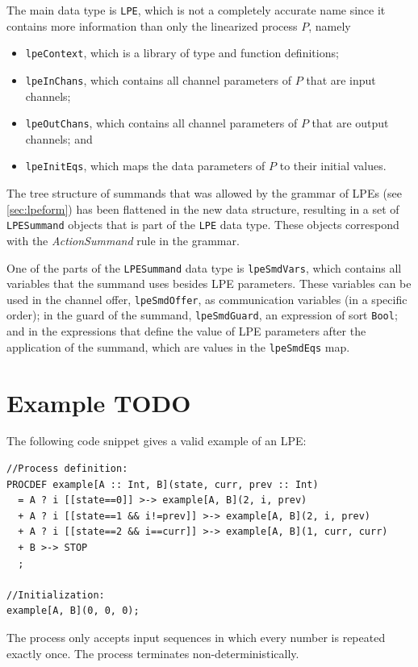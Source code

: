 The main data type is \texttt{LPE}, which is not a completely accurate name since it contains more information than only the linearized \txs{} process $P$, namely

\begin{itemize}
\item \texttt{lpeContext}, which is a library of \txs{} type and function definitions;
\item \texttt{lpeInChans}, which contains all channel parameters of $P$ that are input channels;
\item \texttt{lpeOutChans}, which contains all channel parameters of $P$ that are output channels; and
\item \texttt{lpeInitEqs}, which maps the data parameters of $P$ to their initial values.
\end{itemize}

The tree structure of summands that was allowed by the grammar of LPEs (see \ref{sec:lpeform}) has been flattened in the new data structure, resulting in a set of \texttt{LPESummand} objects that is part of the \texttt{LPE} data type.
These objects correspond with the \textit{ActionSummand} rule in the grammar.

One of the parts of the \texttt{LPESummand} data type is \texttt{lpeSmdVars}, which contains all variables that the summand uses besides LPE parameters.
These variables can be used in the channel offer, \texttt{lpeSmdOffer}, as communication variables (in a specific order); in the guard of the summand, \texttt{lpeSmdGuard}, an expression of sort \texttt{Bool}; and in the expressions that define the value of LPE parameters after the application of the summand, which are values in the \texttt{lpeSmdEqs} map.

\section{Example TODO}

The following code snippet gives a valid example of an LPE:

\begin{lstlisting}
//Process definition:
PROCDEF example[A :: Int, B](state, curr, prev :: Int)
  = A ? i [[state==0]] >-> example[A, B](2, i, prev)
  + A ? i [[state==1 && i!=prev]] >-> example[A, B](2, i, prev)
  + A ? i [[state==2 && i==curr]] >-> example[A, B](1, curr, curr)
  + B >-> STOP
  ;

//Initialization:
example[A, B](0, 0, 0);
\end{lstlisting}

The process only accepts input sequences in which every number is repeated exactly once.
The process terminates non-deterministically.
